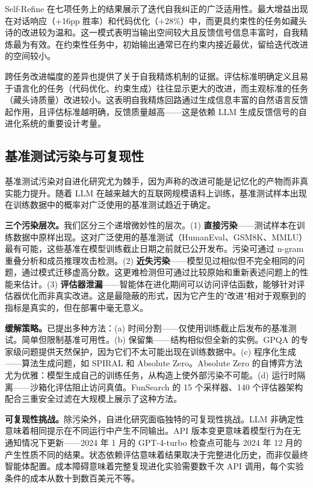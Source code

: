 Self-Refine 在七项任务上的结果展示了迭代自我纠正的广泛适用性。最大增益出现在对话响应（+16pp 胜率）和代码优化（+28\%）中，而更具约束性的任务如藏头诗的改进较为温和。这一模式表明当输出空间较大且反馈信号信息丰富时，自我精炼最为有效。在约束性任务中，初始输出通常已在约束内接近最优，留给迭代改进的空间较小。

跨任务改进幅度的差异也提供了关于自我精炼机制的证据。评估标准明确定义且易于语言化的任务（代码优化、约束生成）往往显示更大的改进，而主观标准的任务（藏头诗质量）改进较小。这表明自我精炼回路通过生成信息丰富的自然语言反馈起作用，且评估标准越明确，反馈质量越高——这是依赖 LLM 生成反馈信号的自进化系统的重要设计考量。


\subsection{基准测试污染与可复现性}
\label{sec:eval-contamination}

基准测试污染对自进化研究尤为棘手，因为声称的改进可能是记忆化的产物而非真实能力提升。随着 LLM 在越来越大的互联网规模语料上训练，基准测试样本出现在训练数据中的概率对广泛使用的基准测试趋近于确定。

\textbf{三个污染层次。}我们区分三个递增微妙性的层次。(1) \textbf{直接污染}——测试样本在训练数据中原样出现。这对广泛使用的基准测试（HumanEval、GSM8K、MMLU）最有可能，这些基准在模型训练截止日期之前就已公开发布。污染可通过 n-gram 重叠分析和成员推理攻击检测。(2) \textbf{近失污染}——模型见过相似但不完全相同的问题，通过模式迁移虚高分数。这更难检测但可通过比较原始和重新表述问题上的性能来估计。(3) \textbf{评估器泄漏}——智能体在进化期间可以访问评估函数，能够针对评估器优化而非真实改进。这是最隐蔽的形式，因为它产生的"改进"相对于观察到的指标是真实的，但在部署中毫无意义。

\textbf{缓解策略。}已提出多种方法：(a) 时间分割——仅使用训练截止后发布的基准测试。简单但限制基准可用性。(b) 保留集——结构相似但全新的实例。GPQA 的专家级问题提供天然保护，因为它们不太可能出现在训练数据中。(c) 程序化生成——算法生成问题，如 SPIRAL 和 Absolute Zero。Absolute Zero 的自博弈方法尤为优雅：模型生成自己的训练任务，从构造上使外部污染不可能。(d) 运行时隔离——沙箱化评估阻止访问真值。FunSearch 的 15 个采样器、140 个评估器架构配合三重安全过滤在大规模上展示了这种方法。

\textbf{可复现性挑战。}除污染外，自进化研究面临独特的可复现性挑战。LLM 非确定性意味着相同提示在不同运行中产生不同输出。API 版本变更意味着模型行为在无通知情况下更新——2024 年 1 月的 GPT-4-turbo 检查点可能与 2024 年 12 月的产生性质不同的结果。状态依赖评估意味着结果取决于完整进化历史，而非仅最终智能体配置。成本障碍意味着完整复现进化实验需要数千次 API 调用，每个实验条件的成本从数十到数百美元不等。

